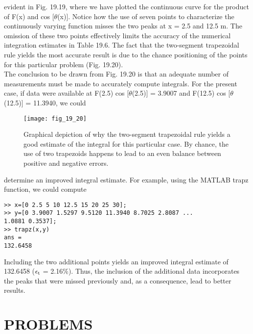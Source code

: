 \documentclass[../main.tex]{subfiles}
\begin{document}
evident in Fig. 19.19, where we have plotted the continuous curve for the product of F(x)
and cos [$\theta$(x)]. Notice how the use of seven points to characterize the continuously varying
function misses the two peaks at x = 2.5 and 12.5 m. The omission of these two points effectively limits the accuracy of the numerical integration estimates in Table 19.6. The fact
that the two-segment trapezoidal rule yields the most accurate result is due to the chance
positioning of the points for this particular problem (Fig. 19.20).\\
The conclusion to be drawn from Fig. 19.20 is that an adequate number of measurements must be made to accurately compute integrals. For the present case, if data were
available at F(2.5) cos [$\theta$(2.5)] = 3.9007 and F(12.5) cos [$\theta$(12.5)] = 11.3940, we could

\begin{figure}[H]
    \centering
    \texttt{[image: fig\_19\_20]}
   \caption{\textsf{Graphical depiction of why the two-segment trapezoidal rule yields a good estimate of the
   integral for this particular case. By chance, the use of two trapezoids happens to lead to an
   even balance between positive and negative errors.}}\label{fig:fig_19_20}
\end{figure}

determine an improved integral estimate. For example, using the MATLAB trapz function, we could compute

\begin{lstlisting}[numbers=none]
>> x=[0 2.5 5 10 12.5 15 20 25 30];
>> y=[0 3.9007 1.5297 9.5120 11.3940 8.7025 2.8087 ...
1.0881 0.3537];
>> trapz(x,y)
ans =
132.6458
\end{lstlisting}

Including the two additional points yields an improved integral estimate of 132.6458
($\epsilon\textsubscript{t}$ = 2.16\%{}). Thus, the inclusion of the additional data incorporates the peaks that were
missed previously and, as a consequence, lead to better results.
\vspace{1cm}
\section{PROBLEMS}
\end{document}
